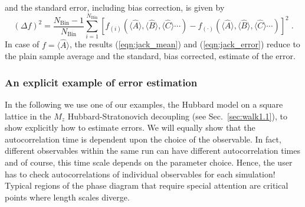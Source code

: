 \documentclass{SciPost}
\begin{document}
and the standard error, including bias correction, is given by
\begin{equation}
\label{eqn:jack_error}
(\Delta f)^{2} = 
\frac{N_{\text{Bin}}-1}{N_{\text{Bin}}} \sum\limits_{i=1}^{N_{\text{Bin}}}
\left[f_{(i)}(\langle \hat{A} \rangle, \langle \hat{B} \rangle, \langle \hat{C} \rangle  \cdots)
- f_{(\cdot)}(\langle \hat{A} \rangle, \langle \hat{B} \rangle, \langle \hat{C} \rangle  \cdots)\right]^{2}\;.
\end{equation}
In case of $f=\langle\hat A\rangle$, the results (\ref{eqn:jack_mean}) and (\ref{eqn:jack_error}) reduce to the plain sample average and the standard, bias corrected, estimate of the error.

%
\subsubsection{An explicit example of error estimation}\label{sec:autocorr}
%
In the following we use one of our examples, the Hubbard model on a square lattice in the $M_z$ Hubbard-Stratonovich decoupling (see Sec.~\ref{sec:walk1.1}), to show explicitly how to estimate errors.  We will equally show that the  autocorrelation time is dependent upon the  choice of the observable.  In fact, different observables within the same run can have different autocorrelation times  and of course, this time scale depends on the  parameter choice.  Hence, the user has to check  autocorrelations of individual observables for each simulation!  Typical regions of the phase diagram that require special attention are critical points  where length scales diverge.  
\end{document}
